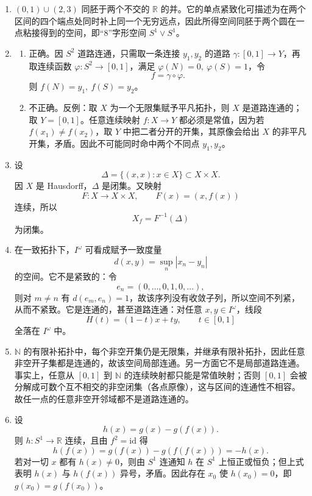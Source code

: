 \documentclass{article}
\newcommand{\R}{\mathbb{R}}
\newcommand{\N}{\mathbb{N}}
\begin{document}
\renewcommand{\labelenumi}{题 \theenumi.}
\begin{enumerate}
  \item $(0,1)\cup(2,3)$ 同胚于两个不交的 $\R$ 的并。它的单点紧致化可描述为在两个区间的四个端点处同时补上同一个无穷远点，因此所得空间同胚于两个圆在一点粘接得到的空间，即“8”字形空间 $S^1\vee S^1$。

  \item
        \begin{enumerate}
          \item 正确。因 $S^2$ 道路连通，只需取一条连接 $y_1,y_2$ 的道路 $\gamma:[0,1]\to Y$，再取连续函数 $\varphi:S^2\to[0,1]$，满足 $\varphi(N)=0,\ \varphi(S)=1$，令
                \[
                  f=\gamma\circ\varphi.
                \]
                则 $f(N)=y_1,\ f(S)=y_2$。

          \item 不正确。反例：取 $X$ 为一个无限集赋予平凡拓扑，则 $X$ 是道路连通的；取 $Y=[0,1]$。任意连续映射 $f:X\to Y$ 都必须是常值，因为若 $f(x_1)\neq f(x_2)$，取 $Y$ 中把二者分开的开集，其原像会给出 $X$ 的非平凡开集，矛盾。因此不可能同时命中两个不同点 $y_1,y_2$。
        \end{enumerate}

  \item 设
        \[
          \Delta=\{(x,x):x\in X\}\subset X\times X.
        \]
        因 $X$ 是 Hausdorff，$\Delta$ 是闭集。又映射
        \[
          F:X\to X\times X,\qquad F(x)=(x,f(x))
        \]
        连续，所以
        \[
          X_f=F^{-1}(\Delta)
        \]
        为闭集。

  \item 在一致拓扑下，$I^\omega$ 可看成赋予一致度量
        \[
          d(x,y)=\sup_n|x_n-y_n|
        \]
        的空间。它不是紧致的：令
        \[
          e_n=(0,\dots,0,1,0,\dots),
        \]
        则对 $m\neq n$ 有 $d(e_m,e_n)=1$，故该序列没有收敛子列，所以空间不列紧，从而不紧致。它是连通的，甚至道路连通：对任意 $x,y\in I^\omega$，线段
        \[
          H(t)=(1-t)x+ty,\qquad t\in[0,1]
        \]
        全落在 $I^\omega$ 中。

  \item $\N$ 的有限补拓扑中，每个非空开集仍是无限集，并继承有限补拓扑，因此任意非空开子集都是连通的，故该空间局部连通。另一方面它不是局部道路连通。事实上，任意从 $[0,1]$ 到 $\N$ 的连续映射都只能是常值映射；否则 $[0,1]$ 会被分解成可数个互不相交的非空闭集（各点原像），这与区间的连通性不相容。故任一点的任意非空开邻域都不是道路连通的。

  \item 设
        \[
          h(x)=g(x)-g(f(x)).
        \]
        则 $h:S^1\to\R$ 连续，且由 $f^2=\mathrm{id}$ 得
        \[
          h(f(x))=g(f(x))-g(f(f(x)))=-h(x).
        \]
        若对一切 $x$ 都有 $h(x)\neq 0$，则由 $S^1$ 连通知 $h$ 在 $S^1$ 上恒正或恒负；但上式表明 $h(x)$ 与 $h(f(x))$ 异号，矛盾。因此存在 $x_0$ 使 $h(x_0)=0$，即 $g(x_0)=g(f(x_0))$。
\end{enumerate}
\renewcommand{\labelenumi}{\theenumi.}
\end{document}
